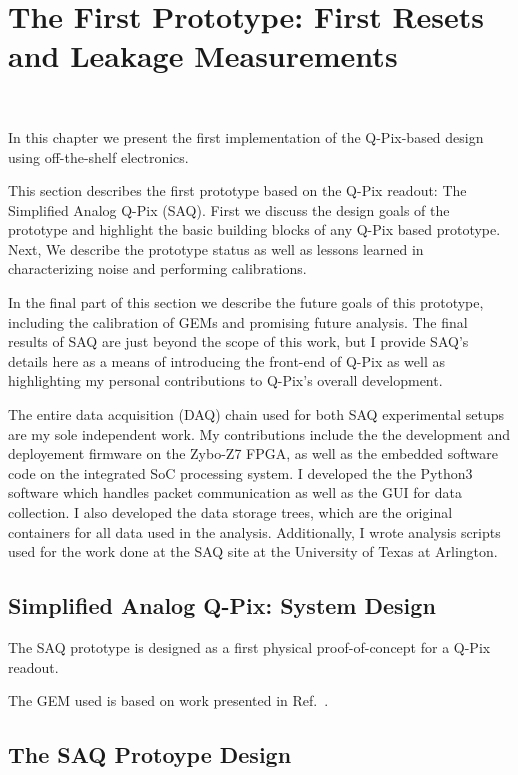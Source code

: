 \chapter{The First Prototype: First Resets and Leakage Measurements}~\label{chap:saq}

In this chapter we present the first implementation of the Q-Pix-based design using off-the-shelf electronics.

This section describes the first prototype based on the Q-Pix readout: The Simplified Analog Q-Pix (SAQ).
First we discuss the design goals of the prototype and highlight the basic building blocks of any Q-Pix based prototype.
Next, We describe the prototype status as well as lessons learned in characterizing noise and performing calibrations.

In the final part of this section we describe the future goals of this prototype, including the calibration of GEMs and promising future analysis.
The final results of SAQ are just beyond the scope of this work, but I provide SAQ's details here as a means of introducing the front-end of Q-Pix as well as highlighting my personal contributions to Q-Pix's overall development.

The entire data acquisition (DAQ) chain used for both SAQ experimental setups are my sole independent work.
My contributions include the the development and deployement firmware on the Zybo-Z7 FPGA, as well as the embedded software code on the integrated SoC processing system.
I developed the the Python3 software which handles packet communication as well as the GUI for data collection.
I also developed the data storage trees, which are the original containers for all data used in the analysis. 
Additionally, I wrote analysis scripts used for the work done at the SAQ site at the University of Texas at Arlington.

\section{Simplified Analog Q-Pix: System Design}

The SAQ prototype is designed as a first physical proof-of-concept for a Q-Pix readout.

The GEM used is based on work presented in Ref.~\citep{THORPE2023167438}.


\section{The SAQ Protoype Design}

